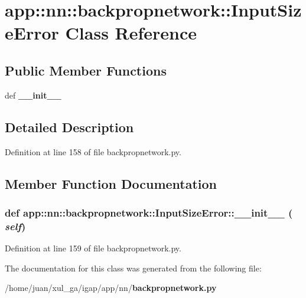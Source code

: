 \section{app::nn::backpropnetwork::InputSizeError Class Reference}
\label{classapp_1_1nn_1_1backpropnetwork_1_1InputSizeError}
\subsection*{Public Member Functions}
\begin{CompactItemize}
\item 
def {\bf \_\-\_\-init\_\-\_\-}
\end{CompactItemize}


\subsection{Detailed Description}


Definition at line 158 of file backpropnetwork.py.

\subsection{Member Function Documentation}
\subsubsection{\setlength{\rightskip}{0pt plus 5cm}def app::nn::backpropnetwork::InputSizeError::\_\-\_\-init\_\-\_\- ( {\em self})}\label{classapp_1_1nn_1_1backpropnetwork_1_1InputSizeError_175e1036c8ce6febf40fd95a938691e4}




Definition at line 159 of file backpropnetwork.py.

The documentation for this class was generated from the following file:\begin{CompactItemize}
\item 
/home/juan/xul\_\-ga/igap/app/nn/{\bf backpropnetwork.py}\end{CompactItemize}
